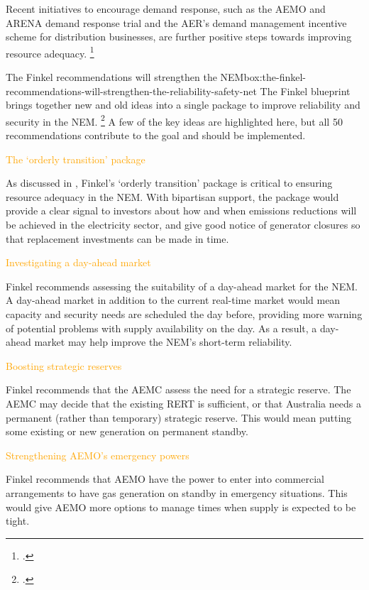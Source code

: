 \documentclass[FrontPage]{grattan}
\newenvironment{alphafootnotes}{}{}
\begin{document}
Recent initiatives to encourage demand response, such as the AEMO and ARENA demand response trial and the AER's demand management incentive scheme for distribution businesses, are further positive steps towards improving resource adequacy.%
\footcites{AEMOARENA2017DemandTrial}{AER2016DemandMgmtDistribution}

\begin{bigbox*}{The Finkel recommendations will strengthen the NEM}{box:the-finkel-recommendations-will-strengthen-the-reliability-safety-net}
\setlength{\parskip}{6pt}
\setlength{\intextsep}{6pt}
\begin{alphafootnotes}
The Finkel blueprint brings together new and old ideas into a single package to improve reliability and security in the NEM\@.%
\footcite[][]{Finkel2017ReviewFinal}
A few of the key ideas are highlighted here, but all 50 recommendations contribute to the goal and should be implemented.

\textcolor{Orange}{The `orderly transition' package}

As discussed in , Finkel's `orderly transition' package is critical to ensuring resource adequacy in the NEM\@. With bipartisan support, the package would provide a clear signal to investors about how and when emissions reductions will be achieved in the electricity sector, and give good notice of generator closures so that replacement investments can be made in time. 

\textcolor{Orange}{Investigating a day-ahead market}

Finkel recommends assessing the suitability of a day-ahead market for the NEM\@. A day-ahead market in addition to the current real-time market would mean capacity and security needs are scheduled the day before, providing more warning of potential problems with supply availability on the day. As a result, a day-ahead market may help improve the NEM's short-term reliability.

\textcolor{Orange}{Boosting strategic reserves}

Finkel recommends that the AEMC assess the need for a strategic reserve. The AEMC may decide that the existing RERT is sufficient, or that Australia needs a permanent (rather than temporary) strategic reserve. This would mean putting some existing or new generation on permanent standby.

\textcolor{Orange}{Strengthening AEMO's emergency powers}

Finkel recommends that AEMO have the power to enter into commercial arrangements to have gas generation on standby in emergency situations. This would give AEMO more options to manage times when supply is expected to be tight.


\end{alphafootnotes}
\end{bigbox*}
\end{document}
